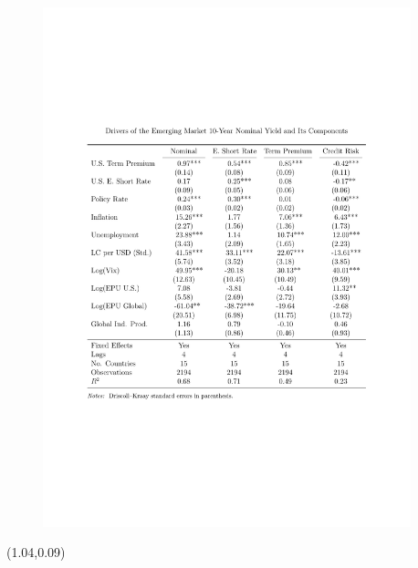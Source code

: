 \documentclass[12pt, aspectratio=169, xcolor=dvipsnames]{beamer}
\begin{document}
\begin{frame}[label=Drivers10Y]
\vspace{-0.8cm}
\begin{figure}[!htbp]
	\begin{center} %
		\includegraphics[trim={2cm 7.2cm 2cm 4cm},clip, width=0.95\textwidth,height=1.15\textheight]{../Tables/ycdcmp10y.pdf}
		\par\end{center}
\end{figure}
\begin{textblock*}{5cm}(1.04\textwidth,0.09\textheight)
	\hyperlink{Drivers10Y2Y}{}
\end{textblock*}
\end{frame}
\end{document}
